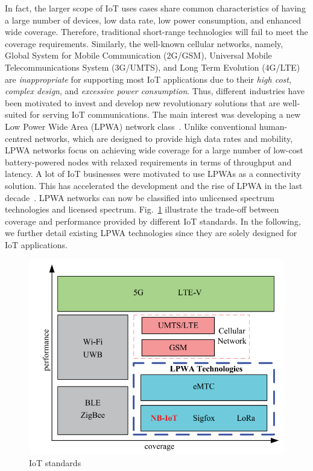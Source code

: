 \documentclass[]{IEEEtran}
\begin{document}
In fact, the larger scope of IoT uses cases share common characteristics of having a large number of devices, low data rate, low power consumption, and enhanced wide coverage.
Therefore, traditional short-range technologies will fail to meet the coverage requirements.
Similarly, the well-known cellular networks, namely, Global System for Mobile Communication (2G/GSM), Universal Mobile Telecommunications System (3G/UMTS), and Long Term Evolution (4G/LTE) are \textit{inappropriate} for supporting most IoT applications due to their \textit{high cost}, \textit{complex design}, and \textit{excessive power consumption}.
Thus, different industries have been motivated to invest and develop new revolutionary solutions that are well-suited for serving IoT communications.
The main interest was developing a new Low Power Wide Area (LPWA) network class~\cite{akpakwu2017survey}.
Unlike conventional human-centred networks, which are designed to provide high data rates and mobility, LPWA networks focus on achieving wide coverage for a large number of low-cost battery-powered nodes with relaxed requirements in terms of throughput and latency.
A lot of IoT businesses were motivated to use LPWAs as a connectivity solution.
This has accelerated the development and the rise of LPWA in the last decade~\cite{hwang_survey_2019}.
LPWA networks can now be classified into unlicensed spectrum technologies and licensed spectrum.
Fig.~\ref{fig:nb-iot} illustrate the trade-off between coverage and performance provided by different IoT standards.
In the following, we further detail existing LPWA technologies since they are solely designed for IoT applications.~

\begin{figure}
    \centering
    \includegraphics[width=\linewidth]{Pictures/NB-IoT example.png}
    \caption{IoT standards}
    \label{fig:nb-iot}
\end{figure}
\end{document}

